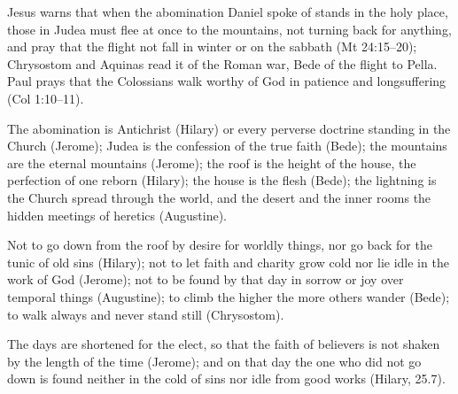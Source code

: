 \begin{fourSenses}
\item[Literal.] Jesus warns that when the abomination Daniel spoke of stands
in the holy place, those in Judea must flee at once to the mountains, not
turning back for anything, and pray that the flight not fall in winter or on
the sabbath (Mt 24:15--20); Chrysostom and Aquinas read it of the Roman war,
Bede of the flight to Pella. Paul prays that the Colossians walk worthy of
God in patience and longsuffering (Col 1:10--11).
\item[Allegorical.] The abomination is Antichrist (Hilary) or every perverse
doctrine standing in the Church (Jerome); Judea is the confession of the true
faith (Bede); the mountains are the eternal mountains (Jerome); the roof is
the height of the house, the perfection of one reborn (Hilary); the house is
the flesh (Bede); the lightning is the Church spread through the world, and
the desert and the inner rooms the hidden meetings of heretics (Augustine).
\item[Moral.] Not to go down from the roof by desire for worldly things, nor
go back for the tunic of old sins (Hilary); not to let faith and charity grow
cold nor lie idle in the work of God (Jerome); not to be found by that day in
sorrow or joy over temporal things (Augustine); to climb the higher the more
others wander (Bede); to walk always and never stand still (Chrysostom).
\item[Anagogical.] The days are shortened for the elect, so that the faith of
believers is not shaken by the length of the time (Jerome); and on that day
the one who did not go down is found neither in the cold of sins nor idle from
good works (Hilary, 25.7).
\end{fourSenses}
